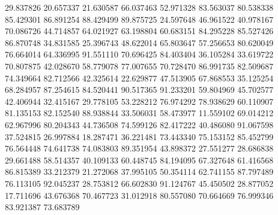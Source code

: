 29.837826
20.657337
21.630587
66.037463
52.971328
83.563037
80.538338
85.429301
86.891254
88.429499
89.875725
24.597648
46.961522
40.978167
70.086726
44.714857
64.021927
63.198804
60.683151
84.295228
85.527426
86.870748
34.831585
25.396743
48.622014
65.803647
57.256653
80.620049
76.664014
64.336995
91.551110
70.696425
84.403404
36.105284
33.619722
70.807875
42.028670
58.779078
77.007655
70.728470
86.991735
82.509687
74.349664
82.712566
42.325614
22.629877
47.513905
67.868553
35.125254
68.284957
87.254615
84.520441
90.517365
91.233201
59.804969
45.702577
42.406944
32.415167
29.778105
53.228212
76.974292
78.938629
60.110907
81.135153
82.152540
88.938844
33.506031
58.473977
11.559102
69.014212
62.967996
80.204343
44.736508
74.599126
82.417222
40.486080
91.067598
37.524815
26.997884
18.287471
36.221481
73.443340
75.153152
85.452799
76.564448
74.641738
74.083803
89.351954
43.898372
27.551277
28.686838
29.661488
58.514357
40.109133
60.448745
84.194095
67.327648
61.416568
86.815389
33.212379
21.272068
37.995105
50.354114
62.741155
87.797489
76.113105
92.045237
28.753812
66.602830
91.124767
45.450502
28.877052
17.711696
43.676368
70.467723
31.012918
80.557080
70.664669
76.999346
83.921387
73.683789
